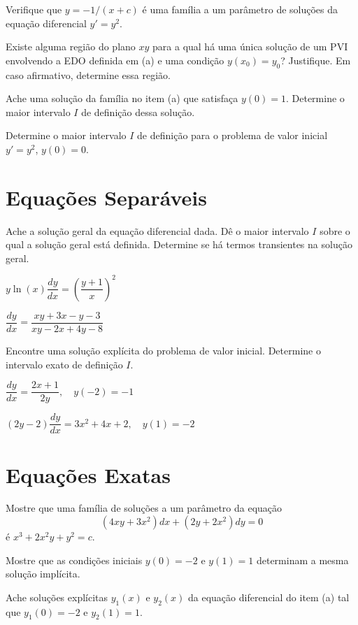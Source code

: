 \documentclass[oneside,12pt,a4paper]{report}
\begin{document}
\begin{itensquestao}
    \item Verifique que $y=-1/(x+c)$ é uma família a um parâmetro de soluções da equação diferencial $y'=y^2$.
    \item Existe alguma região do plano $xy$ para a qual há uma única solução de um PVI envolvendo a EDO definida em (a) e uma condição $y(x_0)=y_0$? Justifique. Em caso afirmativo, determine essa região.
    \item Ache uma solução da família no item (a) que satisfaça $y(0)=1$. Determine o maior intervalo $I$ de definição dessa solução.
    \item Determine o maior intervalo $I$ de definição para o problema de valor inicial $y'=y^2$, $y(0)=0$.
\end{itensquestao}

\section{Equações Separáveis}

 Ache a solução geral da equação diferencial dada. Dê o maior intervalo $I$ sobre o qual a solução geral está definida. Determine se há termos transientes na solução geral.
\begin{itensquestao}[2]
    \item $y\ln(x)\dfrac{dy}{dx}=\left(\dfrac{y+1}{x}\right)^2$
    \item $\dfrac{dy}{dx}=\dfrac{xy+3x-y-3}{xy-2x+4y-8}$
\end{itensquestao}

 Encontre uma solução explícita do problema de valor inicial. Determine o intervalo exato de definição $I$.
\begin{itensquestao}[2]
    \item $\dfrac{dy}{dx}=\dfrac{2x+1}{2y},\quad y(-2)=-1$
    \item $(2y-2)\dfrac{dy}{dx}=3x^2+4x+2,\quad y(1)=-2$
\end{itensquestao}

\section{Equações Exatas}

\begin{itensquestao}
    \item Mostre que uma família de soluções a um parâmetro da equação
    \[(4xy+3x^2)dx+(2y+2x^2)dy=0\]
    é $x^3+2x^2y+y^2=c$.
    \item Mostre que as condições iniciais $y(0)=-2$ e $y(1)=1$ determinam a mesma solução implícita.
    \item Ache soluções explícitas $y_1(x)$ e $y_2(x)$ da equação diferencial do item (a) tal que $y_1(0)=-2$ e $y_2(1)=1$. 
\end{itensquestao}
\end{document}
